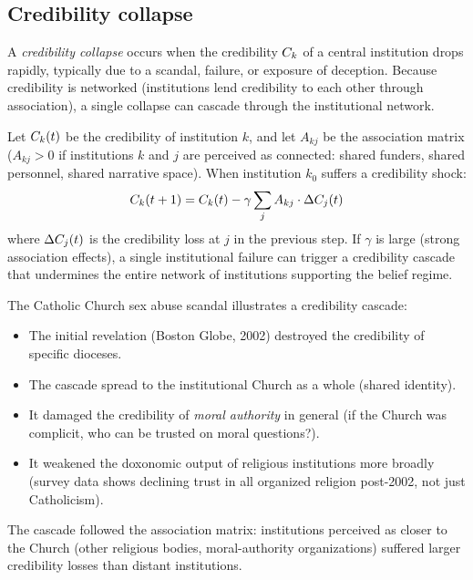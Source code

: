 \subsection{Credibility collapse}

\begin{definition}
\label{def:credibility-collapse}
A \emph{credibility collapse} occurs when the credibility $C_{k}$ of a central institution drops rapidly, typically due to a scandal, failure, or exposure of deception.
Because credibility is networked (institutions lend credibility to each other through association), a single collapse can cascade through the institutional network.
\end{definition}

\begin{model}
\label{mod:credibility-cascade}
Let $C_{k}(t)$ be the credibility of institution $k$, and let $A_{kj}$ be the association matrix ($A_{kj} > 0$ if institutions $k$ and $j$ are perceived as connected: shared funders, shared personnel, shared narrative space).
When institution $k_0$ suffers a credibility shock:
\[
  C_{k}(t+1) = C_{k}(t) - \gamma \sum_{j} A_{kj} \cdot \Delta C_{j}(t)
\]
where $\Delta C_{j}(t)$ is the credibility loss at $j$ in the previous step.
If $\gamma$ is large (strong association effects), a single institutional failure can trigger a credibility cascade that undermines the entire network of institutions supporting the belief regime.
\end{model}

\begin{example}
\label{ex:credibility-cascade}
The Catholic Church sex abuse scandal illustrates a credibility cascade:
\begin{itemize}[nosep]
  \item The initial revelation (Boston Globe, 2002) destroyed the credibility of specific dioceses.
  \item The cascade spread to the institutional Church as a whole (shared identity).
  \item It damaged the credibility of \emph{moral authority} in general (if the Church was complicit, who can be trusted on moral questions?).
  \item It weakened the doxonomic output of religious institutions more broadly (survey data shows declining trust in all organized religion post-2002, not just Catholicism).
\end{itemize}
The cascade followed the association matrix: institutions perceived as closer to the Church (other religious bodies, moral-authority organizations) suffered larger credibility losses than distant institutions.
\end{example}


